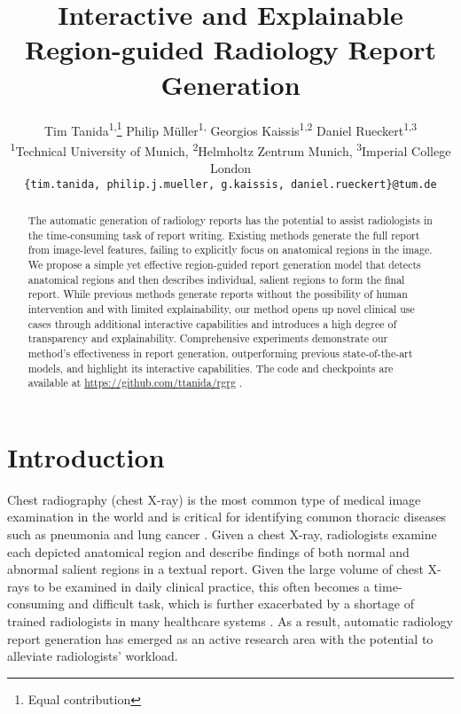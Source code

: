 \documentclass[10pt,twocolumn,letterpaper]{article}
\begin{document}
\title{Interactive and Explainable Region-guided Radiology Report Generation}

\author{Tim Tanida\textsuperscript{1,}\thanks{Equal contribution} \qquad
    Philip Müller\textsuperscript{1,}\footnotemark[1] \qquad
    Georgios Kaissis\textsuperscript{1,2} \qquad Daniel Rueckert\textsuperscript{1,3} \\
    \textsuperscript{1}Technical University of Munich, \textsuperscript{2}Helmholtz Zentrum Munich, \textsuperscript{3}Imperial College London \\
    {\tt\small \{tim.tanida, philip.j.mueller, g.kaissis, daniel.rueckert\}@tum.de}
}
\maketitle

\begin{abstract}
The automatic generation of radiology reports has the potential to assist radiologists in the time-consuming task of report writing. Existing methods generate the full report from image-level features, failing to explicitly focus on anatomical regions in the image. We propose a simple yet effective region-guided report generation model that detects anatomical regions and then describes individual, salient regions to form the final report. While previous methods generate reports without the possibility of human intervention and with limited explainability, our method opens up novel clinical use cases through additional interactive capabilities and introduces a high degree of transparency and explainability. Comprehensive experiments demonstrate our method's effectiveness in report generation, outperforming previous state-of-the-art models, and highlight its interactive capabilities. The code and checkpoints are available at \url{https://github.com/ttanida/rgrg} .
\end{abstract}

\section{Introduction}
\label{introduction}

Chest radiography (chest X-ray) is the most common type of medical image examination in the world and is critical for identifying common thoracic diseases such as pneumonia and lung cancer \cite{raoof2012interpretation, johnson2019mimicphysio}. Given a chest X-ray, radiologists examine each depicted anatomical region and describe findings of both normal and abnormal salient regions in a textual report\cite{goergen2013evidence}. Given the large volume of chest X-rays to be examined in daily clinical practice, this often becomes a time-consuming and difficult task, which is further exacerbated by a shortage of trained radiologists in many healthcare systems \cite{rosenkrantz2016us, rimmer2017radiologist, bastawrous2017improving}. As a result, automatic radiology report generation has emerged as an active research area with the potential to alleviate radiologists' workload.
\end{document}
